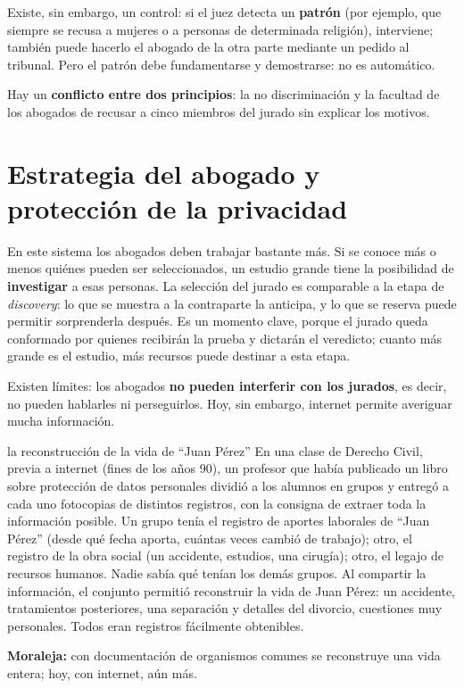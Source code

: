\documentclass[12pt,oneside]{book}
\begin{document}
Existe, sin embargo, un control: si el juez detecta un \textbf{patrón} (por ejemplo, que siempre se recusa a mujeres o a personas de determinada religión), interviene; también puede hacerlo el abogado de la otra parte mediante un pedido al tribunal. Pero el patrón debe fundamentarse y demostrarse: no es automático.

\begin{important}
Hay un \textbf{conflicto entre dos principios}: la no discriminación y la facultad de los abogados de recusar a cinco miembros del jurado sin explicar los motivos.
\end{important}

\section{Estrategia del abogado y protección de la privacidad}

En este sistema los abogados deben trabajar bastante más. Si se conoce más o menos quiénes pueden ser seleccionados, un estudio grande tiene la posibilidad de \textbf{investigar} a esas personas. La selección del jurado es comparable a la etapa de \textit{discovery}: lo que se muestra a la contraparte la anticipa, y lo que se reserva puede permitir sorprenderla después. Es un momento clave, porque el jurado queda conformado por quienes recibirán la prueba y dictarán el veredicto; cuanto más grande es el estudio, más recursos puede destinar a esta etapa.

Existen límites: los abogados \textbf{no pueden interferir con los jurados}, es decir, no pueden hablarles ni perseguirlos. Hoy, sin embargo, internet permite averiguar mucha información.

\begin{example}{la reconstrucción de la vida de ``Juan Pérez''}
En una clase de Derecho Civil, previa a internet (fines de los años 90), un profesor que había publicado un libro sobre protección de datos personales dividió a los alumnos en grupos y entregó a cada uno fotocopias de distintos registros, con la consigna de extraer toda la información posible. Un grupo tenía el registro de aportes laborales de ``Juan Pérez'' (desde qué fecha aporta, cuántas veces cambió de trabajo); otro, el registro de la obra social (un accidente, estudios, una cirugía); otro, el legajo de recursos humanos. Nadie sabía qué tenían los demás grupos. Al compartir la información, el conjunto permitió reconstruir la vida de Juan Pérez: un accidente, tratamientos posteriores, una separación y detalles del divorcio, cuestiones muy personales. Todos eran registros fácilmente obtenibles.

\textbf{Moraleja:} con documentación de organismos comunes se reconstruye una vida entera; hoy, con internet, aún más.
\end{example}
\end{document}
